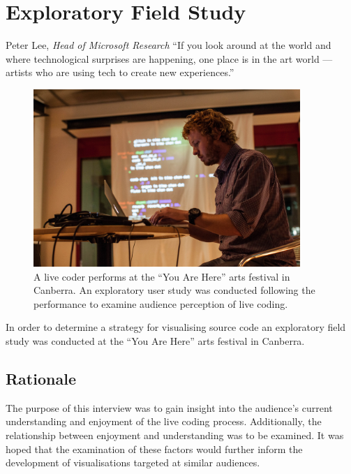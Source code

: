 
\chapter{Exploratory Field Study}
\label{chap:exploratory-field-study}

\begin{chapquote}{Peter Lee, \textit{Head of Microsoft Research}}
``If you look around at the world and where technological surprises are happening, one place is in the art world — artists who are using tech to create new experiences.''
\end{chapquote}

\begin{figure}
\centering
\includegraphics[width=0.9\textwidth]{../images/study-1-you-are-here-ben.jpg}
\caption{A live coder performs at the ``You Are Here'' arts festival in Canberra. An exploratory user study was conducted following the performance to examine audience perception of live coding.}
\label{fig:exploratory-field-study-ben}
\end{figure}

In order to determine a strategy for visualising source code an exploratory field study was conducted at the ``You Are Here'' arts festival in Canberra.

\section{Rationale}

The purpose of this interview was to gain insight into the audience's current understanding and enjoyment of the live coding process. Additionally, the relationship between enjoyment and understanding was to be examined. It was hoped that the examination of these factors would further inform the development of visualisations targeted at similar audiences.

